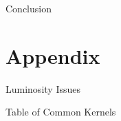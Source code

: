 \documentclass[10pt]{beamer}
\begin{document}
\begin{frame}{Conclusion}

  
\end{frame}


\appendix

\section{Appendix}
\label{sec:appendix}


\begin{frame}{Luminosity Issues}
  \relax  
\end{frame}

\begin{frame}{Table of Common Kernels}
  \relax  
\end{frame}
\end{document}
